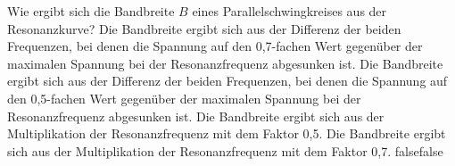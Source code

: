     {Wie ergibt sich die Bandbreite $B$ eines Parallelschwingkreises aus der Resonanzkurve?}
    {Die Bandbreite ergibt sich aus der Differenz der beiden Frequenzen, bei denen die Spannung auf den 0,7-fachen Wert gegenüber der maximalen Spannung bei der Resonanzfrequenz abgesunken ist.}
    {Die Bandbreite ergibt sich aus der Differenz der beiden Frequenzen, bei denen die Spannung auf den 0,5-fachen Wert gegenüber der maximalen Spannung bei der Resonanzfrequenz abgesunken ist.}
    {Die Bandbreite ergibt sich aus der Multiplikation der Resonanzfrequenz mit dem Faktor 0,5.}
    {Die Bandbreite ergibt sich aus der Multiplikation der Resonanzfrequenz mit dem Faktor 0,7.}
    {false}{false}
